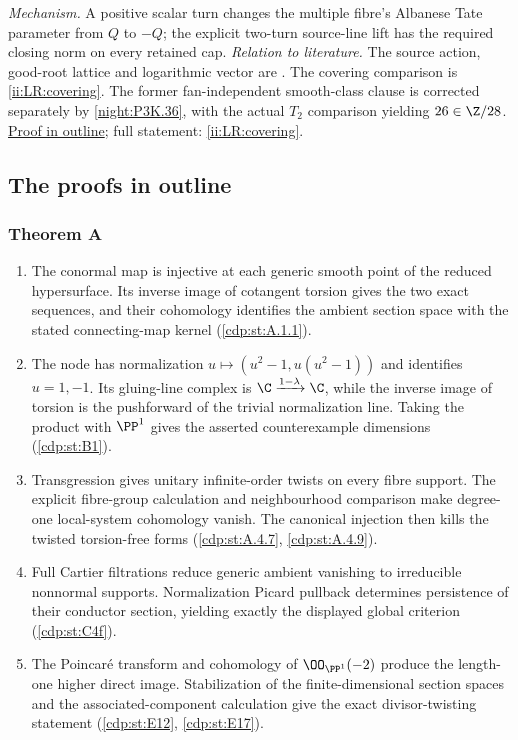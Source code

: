\textit{Mechanism.} A positive scalar turn changes the multiple
fibre's Albanese Tate parameter from $Q$ to $-Q$; the explicit
two-turn source-line lift has the required closing norm on every
retained cap.
\textit{Relation to literature.} The source action, good-root
lattice and logarithmic vector are
\cite[Lemma~2.7, Corollary~2.8, pp.~6--7; Proposition~3.6 and
Definition~3.7, pp.~9--10 of the attached-source edition]{LiuRollenske2026}.
The covering comparison is \ref{ii:LR:covering}. The former
fan-independent smooth-class clause is corrected separately by
\ref{night:P3K.36}, with the actual $T_2$ comparison yielding
$26\in\Z/28$.
\hyperlink{outline-II-G}{Proof in outline}; full statement:
\ref{ii:LR:covering}.

\subsection{The proofs in outline}
\label{series:II:outline}

\hypertarget{outline-II-A}{}
\subsubsection*{Theorem A}
\begin{enumerate}[label=\arabic*.,leftmargin=*]
\item\hypertarget{step-II-A-1}{} The conormal map is injective at
each generic smooth point of the reduced hypersurface. Its inverse
image of cotangent torsion gives the two exact sequences, and their
cohomology identifies the ambient section space with the stated
connecting-map kernel
(\hyperref[cdp:st:A.1.1]{\ref*{cdp:st:A.1.1}}).
\item\hypertarget{step-II-A-2}{} The node has normalization
$u\mapsto(u^2-1,u(u^2-1))$ and identifies $u=1,-1$. Its gluing-line
complex is $\C\xrightarrow{1-\lambda}\C$, while the inverse
image of torsion is the pushforward of the trivial normalization
line. Taking the product with $\PP^1$ gives the asserted
counterexample dimensions
(\hyperref[cdp:st:B1]{\ref*{cdp:st:B1}}).
\item\hypertarget{step-II-A-3}{} Transgression gives unitary
infinite-order twists on every fibre support. The explicit
fibre-group calculation and neighbourhood comparison make
degree-one local-system cohomology vanish. The canonical
injection then kills the twisted torsion-free forms
(\hyperref[cdp:st:A.4.7]{\ref*{cdp:st:A.4.7}},
\hyperref[cdp:st:A.4.9]{\ref*{cdp:st:A.4.9}}).
\item\hypertarget{step-II-A-4}{} Full Cartier filtrations reduce
generic ambient vanishing to irreducible nonnormal supports.
Normalization Picard pullback determines persistence of their
conductor section, yielding exactly the displayed global
criterion (\hyperref[cdp:st:C4f]{\ref*{cdp:st:C4f}}).
\item\hypertarget{step-II-A-5}{} The Poincar\'e transform and
cohomology of $\OO_{\PP^1}(-2)$ produce the length-one higher
direct image. Stabilization of the finite-dimensional section
spaces and the associated-component calculation give the exact
divisor-twisting statement
(\hyperref[cdp:st:E12]{\ref*{cdp:st:E12}},
\hyperref[cdp:st:E17]{\ref*{cdp:st:E17}}).
\end{enumerate}

